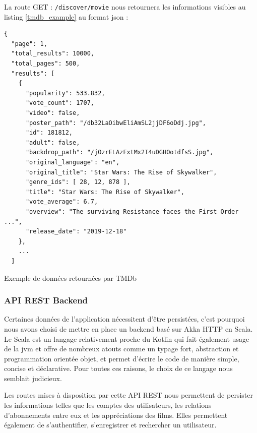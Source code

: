 La route GET : \texttt{/discover/movie} nous retournera les informations visibles au listing \ref{tmdb_example} au format \acrshort{json} :
\bigbreak
\begin{code}
    \begin{verbatim}
{
  "page": 1,
  "total_results": 10000,
  "total_pages": 500,
  "results": [
    {
      "popularity": 533.832,
      "vote_count": 1707,
      "video": false,
      "poster_path": "/db32LaOibwEliAmSL2jjDF6oDdj.jpg",
      "id": 181812,
      "adult": false,
      "backdrop_path": "/jOzrELAzFxtMx2I4uDGHOotdfsS.jpg",
      "original_language": "en",
      "original_title": "Star Wars: The Rise of Skywalker",
      "genre_ids": [ 28, 12, 878 ],
      "title": "Star Wars: The Rise of Skywalker",
      "vote_average": 6.7,
      "overview": "The surviving Resistance faces the First Order ...",
      "release_date": "2019-12-18"
    },
    ...
  ]
    \end{verbatim}
    \caption{Exemple de données retournées par TMDb}
    \label{tmdb_example}
\end{code}
\bigbreak

\subsubsection{API REST Backend}
Certaines données de l'application nécessitent d'être persistées, c'est pourquoi nous avons choisi de mettre en place un backend basé sur Akka HTTP \cite{akka} en Scala. Le Scala est un langage relativement proche du Kotlin qui fait également usage de la \acrshort{jvm} et offre de nombreux atouts comme un typage fort, abstraction et programmation orientée objet, et permet d'écrire le code de manière simple, concise et déclarative. Pour toutes ces raisons, le choix de ce langage nous semblait judicieux.

Les routes mises à disposition par cette API REST nous permettent de persister les informations telles que les comptes des utilisateurs, les relations d'abonnements entre eux et les appréciations des films. Elles permettent également de s'authentifier, s'enregistrer et rechercher un utilisateur.


